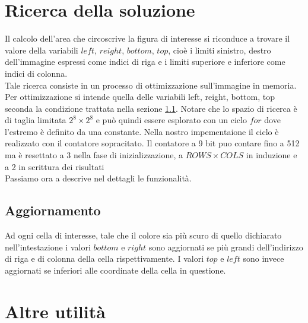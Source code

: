 \section{Ricerca della soluzione}
\label{induzione}
Il calcolo dell’area che circoscrive la figura di interesse si riconduce a trovare il valore della variabili $left$, $reight$, $bottom$, $top$, cioè i limiti sinistro, destro dell'immagine espressi come indici di riga e i limiti superiore e inferiore come indici di colonna. \\

Tale ricerca consiste in un processo di ottimizzazione sull'immagine in memoria. Per ottimizzazione si intende quella delle variabili left, reight, bottom, top seconda la condizione trattata nella sezione \ref{update}.
Notare che lo spazio di ricerca è di taglia limitata $2^8 \times 2^8$ e può quindi essere esplorato con un ciclo $for$ dove l'estremo è definito da una constante. Nella nostro impementaione il ciclo è realizzato con il contatore sopracitato. Il contatore a 9 bit puo contare fino a 512 ma è resettato a 3 nella fase di inizializzazione, a $ROWS \times COLS$ in induzione e a 2 in scrittura dei risultati\\

Passiamo ora a descrive nel dettagli le funzionalità.



\subsection{Aggiornamento}
\label{update}
Ad ogni cella di interesse, tale che il colore sia più scuro di quello dichiarato nell'intestazione i valori $bottom$ e $right$ sono aggiornati se più grandi dell'indirizzo di riga e di colonna della cella rispettivamente. I valori $top$ e $left$ sono invece aggiornati se inferiori alle coordinate della cella in questione.

\section {Altre utilità}

